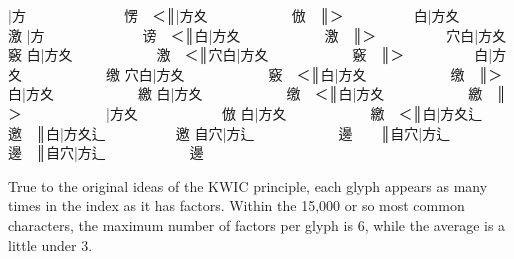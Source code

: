 {\cjk{}{\cnsym{}　　　　}}|{\cjk{}方{\cnsym{}　　　　　　　}愣{\cnsym{}　}＜}║{\cjk{}{\cnsym{}　　　　　　}}|{\cjk{}方夊{\cnsym{}　　　　　　}倣{\cnsym{}　}}║{\cjk{}＞{\cnsym{}　　　　　}白}|{\cjk{}方夊{\cnsym{}　　　　　　}激} 
{\cjk{}{\cnsym{}　　　　}}|{\cjk{}方{\cnsym{}　　　　　　　}谤{\cnsym{}　}＜}║{\cjk{}{\cnsym{}　　　　　}白}|{\cjk{}方夊{\cnsym{}　　　　　　}激{\cnsym{}　}}║{\cjk{}＞{\cnsym{}　　　　　}穴白}|{\cjk{}方夊{\cnsym{}　　　　　　}竅} 
{\cjk{}{\cnsym{}　　　　}白}|{\cjk{}方夊{\cnsym{}　　　　　　}激{\cnsym{}　}＜}║{\cjk{}{\cnsym{}　　　　　}穴白}|{\cjk{}方夊{\cnsym{}　　　　　　}竅{\cnsym{}　}}║{\cjk{}＞{\cnsym{}　　　　　}白}|{\cjk{}方夊{\cnsym{}　　　　　　}缴} 
{\cjk{}{\cnsym{}　　　　}穴白}|{\cjk{}方夊{\cnsym{}　　　　　　}竅{\cnsym{}　}＜}║{\cjk{}{\cnsym{}　　　　　}白}|{\cjk{}方夊{\cnsym{}　　　　　　}缴{\cnsym{}　}}║{\cjk{}＞{\cnsym{}　　　　　}白}|{\cjk{}方夊{\cnsym{}　　　　　　}繳} 
{\cjk{}{\cnsym{}　　　　}白}|{\cjk{}方夊{\cnsym{}　　　　　　}缴{\cnsym{}　}＜}║{\cjk{}{\cnsym{}　　　　　}白}|{\cjk{}方夊{\cnsym{}　　　　　　}繳{\cnsym{}　}}║{\cjk{}＞{\cnsym{}　　　　　　}}|{\cjk{}方夊{\cnsym{}　　　　　　}倣} 
{\cjk{}{\cnsym{}　　　　}白}|{\cjk{}方夊{\cnsym{}　　　　　　}繳{\cnsym{}　}＜}║{\cjk{}{\cnsym{}　　　　　　}白}|{\cjk{}方夊辶{\cnsym{}　　　　　}邀{\cnsym{}　}}║{\cjk{}{\cnsym{}　　　　　　　}白}|{\cjk{}方夊辶{\cnsym{}　　　　　}邀} 
{\cjk{}{\cnsym{}　　　　}自穴}|{\cjk{}方辶{\cnsym{}　　　　　　}邊{\cnsym{}　　}}║{\cjk{}{\cnsym{}　　　　　}自穴}|{\cjk{}方辶{\cnsym{}　　　　　　}邊{\cnsym{}　}}║{\cjk{}{\cnsym{}　　　　　　}自穴}|{\cjk{}方辶{\cnsym{}　　　　　　}邊} 
\endgroup{}{}

\endgroup{}\begin{multicols}{2}\end{multicols}\null\newpage{}\begin{multicols}{2}
True to the original ideas of the KWIC principle, each glyph appears
as many times in the index as it has factors. Within the 15,000 or so most
common characters, the maximum number of factors per glyph is 6, while the
average is a little under 3.\mktsShowpar\par
\end{multicols}\begingroup\mktsObeyAllLines{}

